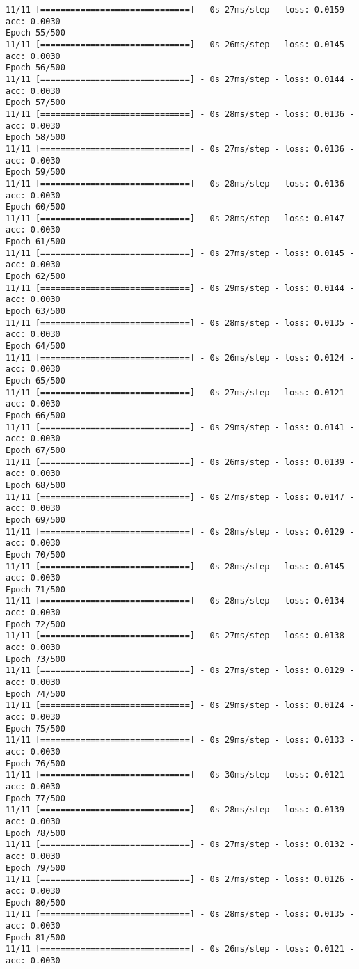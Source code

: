 \documentclass[11pt]{article}
\begin{document}
\begin{Verbatim}[commandchars=\\\{\}]
11/11 [==============================] - 0s 27ms/step - loss: 0.0159 - acc: 0.0030
Epoch 55/500
11/11 [==============================] - 0s 26ms/step - loss: 0.0145 - acc: 0.0030
Epoch 56/500
11/11 [==============================] - 0s 27ms/step - loss: 0.0144 - acc: 0.0030
Epoch 57/500
11/11 [==============================] - 0s 28ms/step - loss: 0.0136 - acc: 0.0030
Epoch 58/500
11/11 [==============================] - 0s 27ms/step - loss: 0.0136 - acc: 0.0030
Epoch 59/500
11/11 [==============================] - 0s 28ms/step - loss: 0.0136 - acc: 0.0030
Epoch 60/500
11/11 [==============================] - 0s 28ms/step - loss: 0.0147 - acc: 0.0030
Epoch 61/500
11/11 [==============================] - 0s 27ms/step - loss: 0.0145 - acc: 0.0030
Epoch 62/500
11/11 [==============================] - 0s 29ms/step - loss: 0.0144 - acc: 0.0030
Epoch 63/500
11/11 [==============================] - 0s 28ms/step - loss: 0.0135 - acc: 0.0030
Epoch 64/500
11/11 [==============================] - 0s 26ms/step - loss: 0.0124 - acc: 0.0030
Epoch 65/500
11/11 [==============================] - 0s 27ms/step - loss: 0.0121 - acc: 0.0030
Epoch 66/500
11/11 [==============================] - 0s 29ms/step - loss: 0.0141 - acc: 0.0030
Epoch 67/500
11/11 [==============================] - 0s 26ms/step - loss: 0.0139 - acc: 0.0030
Epoch 68/500
11/11 [==============================] - 0s 27ms/step - loss: 0.0147 - acc: 0.0030
Epoch 69/500
11/11 [==============================] - 0s 28ms/step - loss: 0.0129 - acc: 0.0030
Epoch 70/500
11/11 [==============================] - 0s 28ms/step - loss: 0.0145 - acc: 0.0030
Epoch 71/500
11/11 [==============================] - 0s 28ms/step - loss: 0.0134 - acc: 0.0030
Epoch 72/500
11/11 [==============================] - 0s 27ms/step - loss: 0.0138 - acc: 0.0030
Epoch 73/500
11/11 [==============================] - 0s 27ms/step - loss: 0.0129 - acc: 0.0030
Epoch 74/500
11/11 [==============================] - 0s 29ms/step - loss: 0.0124 - acc: 0.0030
Epoch 75/500
11/11 [==============================] - 0s 29ms/step - loss: 0.0133 - acc: 0.0030
Epoch 76/500
11/11 [==============================] - 0s 30ms/step - loss: 0.0121 - acc: 0.0030
Epoch 77/500
11/11 [==============================] - 0s 28ms/step - loss: 0.0139 - acc: 0.0030
Epoch 78/500
11/11 [==============================] - 0s 27ms/step - loss: 0.0132 - acc: 0.0030
Epoch 79/500
11/11 [==============================] - 0s 27ms/step - loss: 0.0126 - acc: 0.0030
Epoch 80/500
11/11 [==============================] - 0s 28ms/step - loss: 0.0135 - acc: 0.0030
Epoch 81/500
11/11 [==============================] - 0s 26ms/step - loss: 0.0121 - acc: 0.0030

\end{Verbatim}
\end{document}
